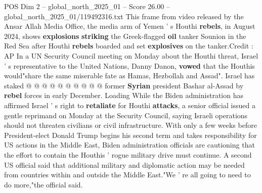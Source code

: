 \begin{textsample}{POS Dim 2 – global\_north\_2025\_01 – Score 26.00 – global\_north\_2025\_01/119492316.txt}
This frame from video released by the Ansar Allah Media Office, the media arm of Yemen ' s Houthi \textbf{rebels}, in August 2024, shows \textbf{explosions} \textbf{striking} the Greek-flagged \textbf{oil} tanker Sounion in the Red Sea after Houthi \textbf{rebels} boarded and set \textbf{explosives} on the tanker.Credit : AP In a UN Security Council meeting on Monday about the Houthi threat, Israel ' s representative to the United Nations, Danny Danon, \textbf{vowed} that the Houthis would"share the same miserable fate as Hamas, Hezbollah and Assad".
Israel has staked @ @ @ @ @ @ @ @ @ @ former \textbf{Syrian} president Bashar al-Assad by \textbf{rebel} forces in early December.
Loading While the Biden administration has affirmed Israel ' s right to \textbf{retaliate} for Houthi \textbf{attacks}, a senior official issued a gentle reprimand on Monday at the Security Council, saying Israeli operations should not threaten civilians or civil infrastructure.
With only a few weeks before President-elect Donald Trump begins his second term and takes responsibility for US actions in the Middle East, Biden administration officials are cautioning that the effort to contain the Houthis ' rogue military drive must continue.
A second US official said that additional military and diplomatic action may be needed from countries within and outside the Middle East."We ' re all going to need to do more,"the official said.

\end{textsample}

